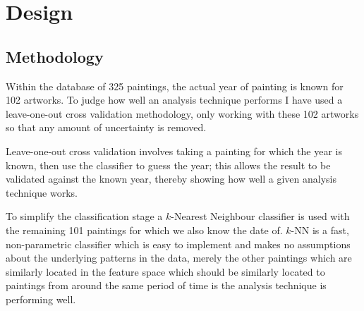 \chapter{Design}







\section{Methodology}

Within the database of 325 paintings, the actual year of painting is known for 102 artworks. 
To judge how well an analysis technique performs I have used a leave-one-out cross validation 
methodology, only working with these 102 artworks so that any amount of uncertainty is removed.

Leave-one-out cross validation involves taking a painting for which the year is known, then use
the classifier to guess the year; this allows the result to be validated against the known year,
thereby showing how well a given analysis technique works.

To simplify the classification stage a $k$-Nearest Neighbour classifier is used with the remaining
101 paintings for which we also know the date of. $k$-NN is a fast, non-parametric classifier
which is easy to implement and makes no assumptions about the underlying patterns in the data, 
merely the other paintings which are similarly located in the feature space which should be 
similarly located to paintings from around the same period of time is the analysis technique is
performing well.

